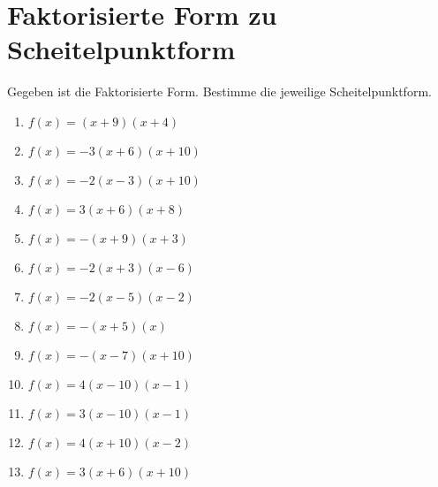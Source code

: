 \documentclass{article}%
\begin{document}
\section{Faktorisierte Form zu Scheitelpunktform}%
\label{sec:FaktorisierteFormzuScheitelpunktform}%
Gegeben ist die Faktorisierte Form. Bestimme die jeweilige Scheitelpunktform.%
\begin{enumerate}[label=\alph*)]%
\item%
\newline\vspace{0.5cm} $f(x)=(x+9)(x+4)$%
\item%
\newline\vspace{0.5cm} $f(x)=-3(x+6)(x+10)$%
\item%
\newline\vspace{0.5cm} $f(x)=-2(x-3)(x+10)$%
\item%
\newline\vspace{0.5cm} $f(x)=3(x+6)(x+8)$%
\item%
\newline\vspace{0.5cm} $f(x)=-(x+9)(x+3)$%
\item%
\newline\vspace{0.5cm} $f(x)=-2(x+3)(x-6)$%
\item%
\newline\vspace{0.5cm} $f(x)=-2(x-5)(x-2)$%
\item%
\newline\vspace{0.5cm} $f(x)=-(x+5)(x)$%
\item%
\newline\vspace{0.5cm} $f(x)=-(x-7)(x+10)$%
\item%
\newline\vspace{0.5cm} $f(x)=4(x-10)(x-1)$%
\item%
\newline\vspace{0.5cm} $f(x)=3(x-10)(x-1)$%
\item%
\newline\vspace{0.5cm} $f(x)=4(x+10)(x-2)$%
\item%
\newline\vspace{0.5cm} $f(x)=3(x+6)(x+10)$%

\end{enumerate}
\end{document}
